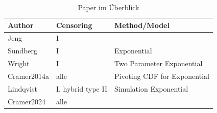 \begin{table}[htbp]
	\centering
	\begin{tabular}{lll}
		\toprule
		Author & Censoring & Method/Model \\
		\midrule
		Jeng          & I               &                                  \\
		Sundberg      & I               & Exponential                      \\
		Wright        & I               & Two Parameter Exponential        \\
		Cramer2014a   & alle            & Pivoting CDF for Exponential     \\
		Lindqvist     & I, hybrid type II & Simulation Exponential        \\
		Cramer2024    & alle            &                                  \\
		\bottomrule
	\end{tabular}
	\caption{Paper im Überblick}
\end{table}